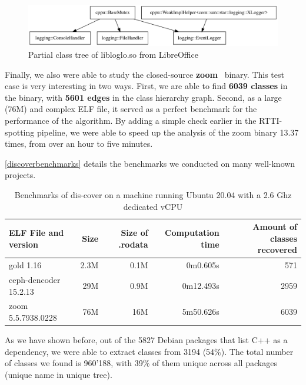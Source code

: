 \documentclass[a4paper,11pt,oneside]{report}
\begin{document}
\begin{figure}[h]

\includegraphics[width=16cm]{libloglo_partial.png}
\caption{Partial class tree of libloglo.so from LibreOffice}
\label{libloglo}

\end{figure}

Finally, we also were able to study the closed-source \textbf{zoom}~\cite{zoom} binary.
This test case is very interesting in two ways.
First, we are able to find \textbf{6039 classes} in the binary, with \textbf{5601 edges} in the class hierarchy graph.
Second, as a large (76M) and complex ELF file, it served as a perfect benchmark for the performance of the algorithm.
By adding a simple check earlier in the RTTI-spotting pipeline, we were able to speed up the analysis of the zoom binary 13.37 times, from over an hour to five minutes.

\autoref{discoverbenchmarks} details the benchmarks we conducted on many well-known projects.

\begin{table}[h]
  \centering
  {\small
  \begin{tabular}{l | r | r | r | r }
    ELF File and version & Size & Size of .rodata & Computation time & Amount of classes recovered  \\
    \hline
    gold 1.16 & 2.3M & 0.1M & 0m0.605s & 571 \\
    ceph-dencoder 15.2.13 & 29M & 0.9M & 0m12.493s & 2959 \\
    zoom 5.5.7938.0228 & 76M & 16M & 5m50.626s & 6039 
  \end{tabular}
  }

\caption{Benchmarks of dis-cover on a machine running Ubuntu 20.04 with a 2.6 Ghz dedicated vCPU}
\label{discoverbenchmarks}

\end{table}

As we have shown before, out of the 5827 Debian packages that list C++ as a dependency, we were able to extract classes from 3194 (54\%).
The total number of classes we found is 960'188, with 39\% of them unique across all packages (unique name in unique tree).

\end{document}
